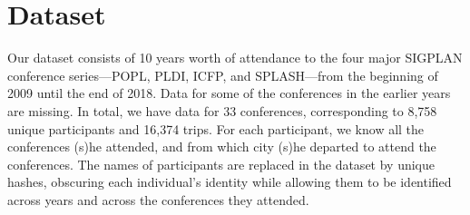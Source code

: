 \section{Dataset}
\label{sec:dataset}
 
Our dataset consists of 10 years worth of attendance to the four major
SIGPLAN conference series---POPL, PLDI, ICFP, and SPLASH---from the
beginning of 2009 until the end of 2018. Data for some of the conferences in the
earlier years are missing. In total, we have data for 33 conferences,
corresponding to 8,758 unique participants and 16,374 trips. For each
participant, we know all the conferences (s)he attended, and from which city
(s)he departed to attend the conferences.
%
The names of participants are replaced in the dataset by unique hashes,
obscuring each individual's identity while allowing them to be identified
across years and across the conferences they attended.


